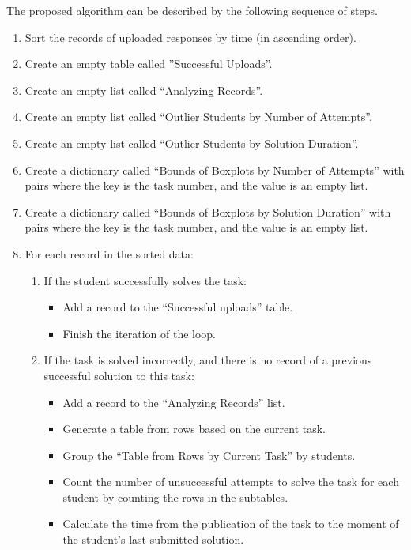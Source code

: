 \documentclass[letterpaper]{article}
\begin{document}
\begin{multicols}{2}
\begin{justify}
      The proposed algorithm can be described by the following sequence of steps.
      \begin{enumerate}
        \item Sort the records of uploaded responses by time (in ascending order).
        \item Create an empty table called ”Successful Uploads”.
        \item Create an empty list called “Analyzing Records”.
        \item Create an empty list called “Outlier Students by Number of Attempts”.
        \item Create an empty list called “Outlier Students by Solution Duration”.
        \item Create a dictionary called “Bounds of Boxplots by Number of Attempts” with pairs where the key is the task number, and the value is an empty list.
        \item Create a dictionary called “Bounds of Boxplots by Solution Duration” with pairs where the key is the task number, and the value is an empty list.
        \item For each record in the sorted data:
        \begin{enumerate}[leftmargin=-2pt, itemindent=37pt]
          \item If the student successfully solves the task:
          \begin{itemize}[leftmargin=30pt, itemindent=0pt]
            \item Add a record to the “Successful uploads” table.
            \item	Finish the iteration of the loop.
          \end{itemize}
          \item If the task is solved incorrectly, and there is no record of a previous successful solution to this task:
          \begin{itemize}[leftmargin=30pt, itemindent=0pt]
            \item Add a record to the “Analyzing Records” list.
            \item Generate a table from rows based on the current task.
            \item Group the “Table from Rows by Current Task” by students.
            \item Count the number of unsuccessful attempts to solve the task for each student by counting the rows in the subtables.
            \item Calculate the time from the publication of the task to the moment of the student's last submitted solution.

\end{itemize}
\end{enumerate}
\end{enumerate}
\end{justify}
\end{multicols}
\end{document}
